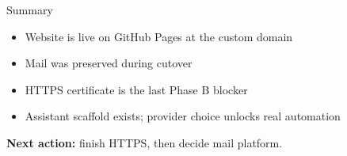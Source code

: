 \documentclass[aspectratio=169,11pt]{beamer}
\begin{document}
\begin{frame}{Summary}
  \begin{itemize}
    \item Website is live on GitHub Pages at the custom domain
    \item Mail was preserved during cutover
    \item HTTPS certificate is the last Phase B blocker
    \item Assistant scaffold exists; provider choice unlocks real automation
  \end{itemize}

  \vspace{1em}
  \centering\textbf{Next action:} finish HTTPS, then decide mail platform.
\end{frame}
\end{document}

